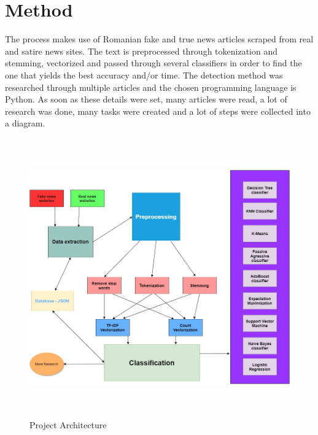 \documentclass{article}
\begin{document}
	\section{Method}
	The process makes use of Romanian fake and true news articles scraped from real and satire news sites. The text is preprocessed through tokenization and stemming, vectorized and passed through several classifiers in order to find the one that yields the best accuracy and/or time. The detection method was researched through multiple articles and the chosen programming language is Python. As soon as these details were set, many articles were read, a lot of research was done, many tasks were created and a lot of steps were collected into a diagram.
	\begin{figure}[!h]
		\centering
		\includegraphics[width=12cm,height=12cm,keepaspectratio]{Pics/Diagram}
		\caption{Project Architecture}
	\end{figure}
	
\end{document}
